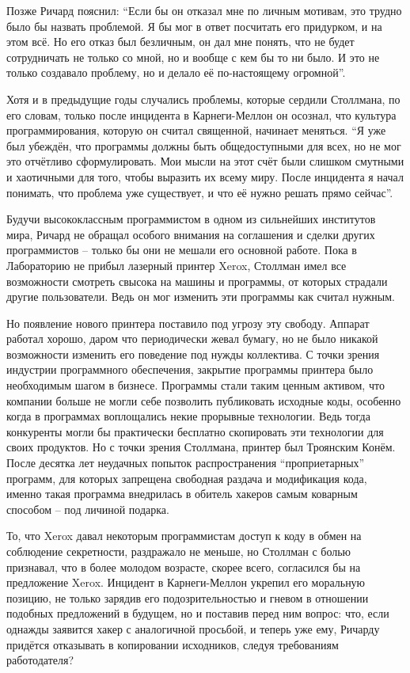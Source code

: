 Позже Ричард пояснил: ``Если бы он отказал мне по личным мотивам, это трудно было бы назвать проблемой. Я бы мог в ответ посчитать его придурком, и на этом всё. Но его отказ был безличным, он дал мне понять, что не будет сотрудничать не только со мной, но и вообще с кем бы то ни было. И это не только создавало проблему, но и делало её по-настоящему огромной''.

Хотя и в предыдущие годы случались проблемы, которые сердили Столлмана, по его словам, только после инцидента в Карнеги-Меллон он осознал, что культура программирования, которую он считал священной, начинает меняться. ``Я уже был убеждён, что программы должны быть общедоступными для всех, но не мог это отчётливо сформулировать. Мои мысли на этот счёт были слишком смутными и хаотичными для того, чтобы выразить их всему миру. После инцидента я начал понимать, что проблема уже существует, и что её нужно решать прямо сейчас''.

Будучи высококлассным программистом в одном из сильнейших институтов мира, Ричард не обращал особого внимания на соглашения и сделки других программистов -- только бы они не мешали его основной работе. Пока в Лабораторию не прибыл лазерный принтер Xerox, Столлман имел все возможности смотреть свысока на машины и программы, от которых страдали другие пользователи. Ведь он мог изменить эти программы как считал нужным.

Но появление нового принтера поставило под угрозу эту свободу. Аппарат работал хорошо, даром что периодически жевал бумагу, но не было никакой возможности изменить его поведение под нужды коллектива. С точки зрения индустрии программного обеспечения, закрытие программы принтера было необходимым шагом в бизнесе. Программы стали таким ценным активом, что компании больше не могли себе позволить публиковать исходные коды, особенно когда в программах воплощались некие прорывные технологии. Ведь тогда конкуренты могли бы практически бесплатно скопировать эти технологии для своих продуктов. Но с точки зрения Столлмана, принтер был Троянским Конём. После десятка лет неудачных попыток распространения ``проприетарных'' программ, для которых запрещена свободная раздача и модификация кода, именно такая программа внедрилась в обитель хакеров самым коварным способом -- под личиной подарка.

То, что Xerox давал некоторым программистам доступ к коду в обмен на соблюдение секретности, раздражало не меньше, но Столлман с болью признавал, что в более молодом возрасте, скорее всего, согласился бы на предложение Xerox. Инцидент в Карнеги-Меллон укрепил его моральную позицию, не только зарядив его подозрительностью и гневом в отношении подобных предложений в будущем, но и поставив перед ним вопрос: что, если однажды заявится хакер с аналогичной просьбой, и теперь уже ему, Ричарду придётся отказывать в копировании исходников, следуя требованиям работодателя?

